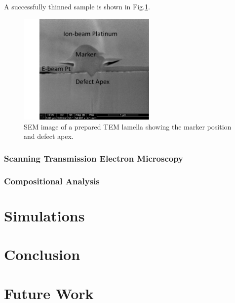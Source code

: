 A successfully thinned sample is shown in Fig.\ref{thinned}.

\begin{figure}[h]
	\centering
	\includegraphics[width=0.6\textwidth]{Figs/Ch3/thinned}
	\caption[h] {SEM image of a prepared TEM lamella showing the marker position and defect apex.}
	\label{thinned}
\end{figure}
\FloatBarrier 


\subsubsection{Scanning Transmission Electron Microscopy}



\subsubsection{Compositional Analysis}

\section{Simulations}

\section{Conclusion}

\section{Future Work}

